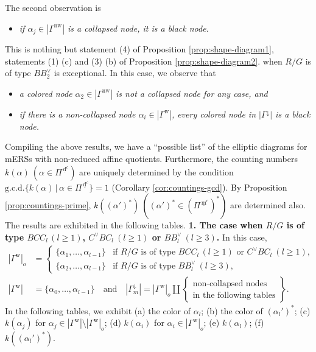 \documentclass[11pt]{amsart}
\newcommand{\dc}{\,\underline{\mathrm{d}}^c}
\newcommand{\mc}{\, \underline{\mathrm{m}}^c}
\newcommand{\w}{\mathrm{w}}
\newcommand{\nw}{\mathrm{nw}}
\begin{document}
{The second observation is
\begin{itemize}
\item[(b)] {\it if $\alpha_j\in |\Gamma^\nw|$ is a collapsed node,
it is a black node.}
\end{itemize}
This is nothing but statement (4) of Proposition \ref{prop:shape-diagram1}, 
 statements (1) (c) and (3) (b) of Proposition \ref{prop:shape-diagram2}.  
 when $R/G$ is of type $BB^\vee_2$ is exceptional. In this case, we
observe that 
\begin{itemize}
\item[(c-1)] {\it a colored node $\alpha_2\in |\Gamma^\nw|$ is 
not a collapsed node for any case, and}
\vskip 1mm
\item[(c-2)] {\it if there is a non-collapsed node $\alpha_i\in |\Gamma^\w|$, every
colored node in $|\Gamma^\downarrow|$ is a black node.}
\end{itemize}
\vskip 3mm

Compiling the above results,  we have a ``possible list'' of 
the elliptic diagrams for mERSs with  non-reduced affine quotients.  
Furthermore, the counting numbers 
$k(\alpha)\ (\alpha\in \Pi^{\dc}%
)$
are uniquely determined by the condition 
$\mathrm{g.c.d.}\{k(\alpha)\, |\, \alpha\in \Pi^{\dc}\}=1$ 
(Corollary \ref{cor:countings-gcd}). By Proposition \ref{prop:countings-prime},
$k((\alpha')^\ast)\ ((\alpha')^\ast\in (\Pi^{\mc})^\ast)$ are determined also. 
The results are exhibited in the following tables.
\vskip 5mm
\noindent
{\bf 1. The case when  $R/G$ is of type $BCC_l\, (l\geq 1)$, 
$C^\vee BC_l\ (l\geq 1)$ or $BB_l^\vee\ (l\geq 3)$.}
In this case, 
\[%
\begin{aligned}
|\Gamma^\w|_o&=\begin{cases}
\{\alpha_1,\ldots,\alpha_{l-1}\} & \text{if $R/G$ is of type 
$BCC_l\, (l\geq 1)$ or $C^\vee BC_l\ (l\geq 1)$,}\\
\{\alpha_2,\ldots,\alpha_{l-1}\} & \text{if $R/G$ is of type 
$BB_l^\vee\ (l\geq 3)$,}
\end{cases}\\
|\Gamma^\w|&=\{\alpha_0,\ldots,\alpha_{l-1}\}\quad\text{and}\quad
|\Gamma_m^\downarrow|=|\Gamma^\w|_o\amalg \left\{
\begin{array}{c}
\text{non-collapsed nodes}\\
\text{in the following tables}
\end{array}
\right\}.
\end{aligned}\]
In the following tables, we exhibit (a) the color of $\alpha_l${\rm ;}
(b) the color of $(\alpha_l')^\ast${\rm ;}
(c) $k(\alpha_j)$ for $\alpha_j\in |\Gamma^\w|\setminus |\Gamma^\w|_o${\rm ;}
(d) $k(\alpha_i)$ for $\alpha_i\in |\Gamma^\w|_o${\rm ;}
(e) $k(\alpha_l)${\rm ;}
(f) $k((\alpha_l')^\ast)$.

}
\end{document}
